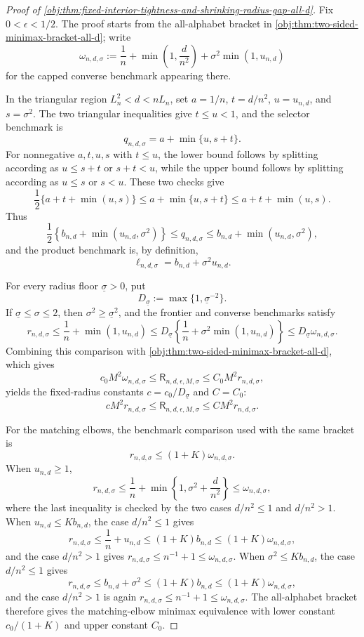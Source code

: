 \begin{proof}[Proof of \cref{obj:thm:fixed-interior-tightness-and-shrinking-radius-gap-all-d}]
Fix \(0<\epsilon<1/2\).  The proof starts from the all-alphabet bracket in \cref{obj:thm:two-sided-minimax-bracket-all-d}; write
\[
\omega_{n,d,\sigma}
:=
\frac1n+\min\left(1,\frac d{n^2}\right)
+\sigma^2\min(1,u_{n,d})
\]
for the capped converse benchmark appearing there.

In the triangular region \(L_n^2<d<nL_n\), set \(a=1/n\), \(t=d/n^2\), \(u=u_{n,d}\), and \(s=\sigma^2\).  The two triangular inequalities give \(t\le u<1\), and the selector benchmark is
\[
q_{n,d,\sigma}=a+\min\{u,s+t\}.
\]
For nonnegative \(a,t,u,s\) with \(t\le u\), the lower bound follows by splitting according as \(u\le s+t\) or \(s+t<u\), while the upper bound follows by splitting according as \(u\le s\) or \(s<u\).  These two checks give
\[
\frac12\{a+t+\min(u,s)\}
\le a+\min\{u,s+t\}
\le a+t+\min(u,s).
\]
Thus
\[
\frac12\left\{b_{n,d}+\min(u_{n,d},\sigma^2)\right\}
\le q_{n,d,\sigma}
\le b_{n,d}+\min(u_{n,d},\sigma^2),
\]
and the product benchmark is, by definition,
\[
\ell_{n,d,\sigma}=b_{n,d}+\sigma^2u_{n,d}.
\]

For every radius floor \(\underline\sigma>0\), put
\[
D_{\underline\sigma}:=\max\{1,\underline\sigma^{-2}\}.
\]
If \(\underline\sigma\le\sigma\le2\), then \(\sigma^2\ge\underline\sigma^2\), and the frontier and converse benchmarks satisfy
\[
r_{n,d,\sigma}
\le \frac1n+\min(1,u_{n,d})
\le D_{\underline\sigma}
\left\{\frac1n+\sigma^2\min(1,u_{n,d})\right\}
\le D_{\underline\sigma}\omega_{n,d,\sigma}.
\]
Combining this comparison with \cref{obj:thm:two-sided-minimax-bracket-all-d}, which gives
\[
c_0M^2\omega_{n,d,\sigma}
\le \mathsf R_{n,d,\epsilon,M,\sigma}
\le C_0M^2r_{n,d,\sigma},
\]
yields the fixed-radius constants \(c=c_0/D_{\underline\sigma}\) and \(C=C_0\):
\[
cM^2r_{n,d,\sigma}
\le
\mathsf R_{n,d,\epsilon,M,\sigma}
\le
CM^2r_{n,d,\sigma}.
\]

For the matching elbows, the benchmark comparison used with the same bracket is
\[
r_{n,d,\sigma}\le (1+K)\omega_{n,d,\sigma}.
\]
When \(u_{n,d}\ge1\),
\[
r_{n,d,\sigma}\le \frac1n+\min\left\{1,\sigma^2+\frac d{n^2}\right\}\le \omega_{n,d,\sigma},
\]
where the last inequality is checked by the two cases \(d/n^2\le1\) and \(d/n^2>1\).  When \(u_{n,d}\le Kb_{n,d}\), the case \(d/n^2\le1\) gives
\[
r_{n,d,\sigma}\le \frac1n+u_{n,d}\le (1+K)b_{n,d}\le(1+K)\omega_{n,d,\sigma},
\]
and the case \(d/n^2>1\) gives \(r_{n,d,\sigma}\le n^{-1}+1\le\omega_{n,d,\sigma}\).  When \(\sigma^2\le Kb_{n,d}\), the case \(d/n^2\le1\) gives
\[
r_{n,d,\sigma}\le b_{n,d}+\sigma^2\le(1+K)b_{n,d}\le(1+K)\omega_{n,d,\sigma},
\]
and the case \(d/n^2>1\) is again \(r_{n,d,\sigma}\le n^{-1}+1\le\omega_{n,d,\sigma}\).  The all-alphabet bracket therefore gives the matching-elbow minimax equivalence with lower constant \(c_0/(1+K)\) and upper constant \(C_0\).


\end{proof}
